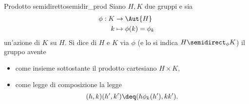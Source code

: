\begin{definition}
    {Prodotto semidiretto}{semidir_prod}
    Siano $H, K$ due gruppi e sia \begin{align*}
        \phi : K &\to \Aut{H}\\
        k &\mapsto \phi(k) = \phi_k
    \end{align*} un'azione di $K$ su $H$. Si dice  di $H$ e $K$ via $\phi$ (e lo si indica $H \semidirect_{\phi} K$) il gruppo avente \begin{itemize}
        \item come insieme sottostante il prodotto cartesiano $H \times K$,
        \item come legge di composizione la legge \[
            (h, k)(h', k') \deq (h \phi_k(h'), kk').
        \]
    \end{itemize}
\end{definition}

